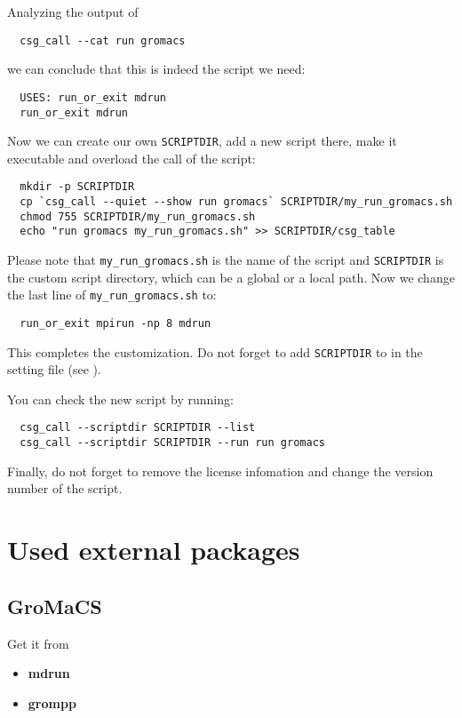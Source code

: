 Analyzing the output of
\begin{verbatim}
  csg_call --cat run gromacs
\end{verbatim}
we can conclude that this is indeed the script we need:
%
\begin{verbatim}
  USES: run_or_exit mdrun
  run_or_exit mdrun
\end{verbatim}
Now we can create our own \texttt{SCRIPTDIR}, add a new script there, make it executable and overload the call of the script:
\begin{verbatim}
  mkdir -p SCRIPTDIR
  cp `csg_call --quiet --show run gromacs` SCRIPTDIR/my_run_gromacs.sh
  chmod 755 SCRIPTDIR/my_run_gromacs.sh
  echo "run gromacs my_run_gromacs.sh" >> SCRIPTDIR/csg_table
\end{verbatim}
Please note that \texttt{my\_run\_gromacs.sh} is the name of the script and \texttt{SCRIPTDIR} is the custom script directory, which can be a global or a local path.
Now we change the last line of \texttt{my\_run\_gromacs.sh} to:
\begin{verbatim}
  run_or_exit mpirun -np 8 mdrun
\end{verbatim}
This completes the customization. Do not forget to add \texttt{SCRIPTDIR} to  in the setting \xml file (see ).

You can check the new script by running:
\begin{verbatim}
  csg_call --scriptdir SCRIPTDIR --list
  csg_call --scriptdir SCRIPTDIR --run run gromacs
\end{verbatim}

Finally, do not forget to remove the license infomation and change the version number of the script.

\section{Used external packages}

\subsection{GroMaCS}
\label{progpack.gromacs}
Get it from 
\begin{itemize}
\item \hypertarget{progex.mdrun}{\textbf{mdrun}}
\item \hypertarget{progex.grompp}{\textbf{grompp}}
\end{itemize}

